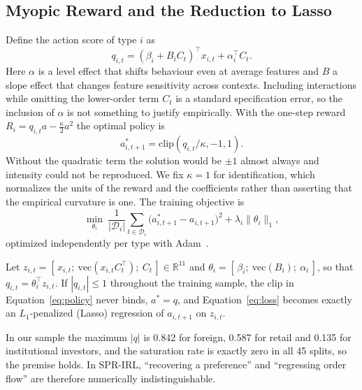 \subsection{Myopic Reward and the Reduction to Lasso}
\label{sec:model}

Define the action score of type $i$ as
\begin{equation}
q_{i,t}=(\beta_i+B_iC_t)^{\top}x_{i,t}+\alpha_i^{\top}C_t.
\label{eq:score}
\end{equation}
Here $\alpha$ is a level effect that shifts behaviour even at average features
and $B$ a slope effect that changes feature sensitivity across contexts.
Including interactions while omitting the lower-order term $C_t$ is a standard
specification error, so the inclusion of $\alpha$ is not something to justify
empirically. With the one-step reward
$R_i=q_{i,t}a-\tfrac{\kappa}{2}a^{2}$ the optimal policy is
\begin{equation}
a^{*}_{i,t+1}=\mathrm{clip}(q_{i,t}/\kappa,-1,1).
\label{eq:policy}
\end{equation}
Without the quadratic term the solution would be $\pm1$ almost always and
intensity could not be reproduced. We fix $\kappa=1$ for identification, which
normalizes the units of the reward and the coefficients rather than asserting
that the empirical curvature is one. The training objective is
\begin{equation}
\min_{\theta_i}\ \frac{1}{|\mathcal{D}_i|}
\sum_{t\in\mathcal{D}_i}\!\bigl(a^{*}_{i,t+1}-a_{i,t+1}\bigr)^{2}
+\lambda_i\lVert\theta_i\rVert_1,
\label{eq:loss}
\end{equation}
optimized independently per type with Adam~\cite{kingma2015adam}.

\begin{proposition}
\label{prop:lasso}
Let
$z_{i,t}=[\,x_{i,t};\ \mathrm{vec}(x_{i,t}C_t^{\top});\ C_t\,]\in\mathbb{R}^{11}$
and $\theta_i=[\,\beta_i;\ \mathrm{vec}(B_i);\ \alpha_i\,]$, so that
$q_{i,t}=\theta_i^{\top}z_{i,t}$. If $|q_{i,t}|\le 1$ throughout the training
sample, the clip in Equation~\eqref{eq:policy} never binds, $a^{*}=q$, and
Equation~\eqref{eq:loss} becomes exactly an $L_1$-penalized (Lasso) regression of
$a_{i,t+1}$ on $z_{i,t}$.
\end{proposition}

In our sample the maximum $|q|$ is 0.842 for foreign, 0.587 for retail and 0.135
for institutional investors, and the saturation rate is exactly zero in all 45
splits, so the premise holds. In SPR-IRL, ``recovering a preference'' and
``regressing order flow'' are therefore numerically indistinguishable.

